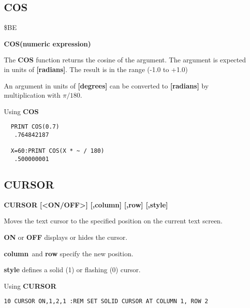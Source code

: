 \subsection{COS}
\begin{description}[leftmargin=2cm,style=nextline]
\item [Token:] \$BE
\item [Format:] {\bf COS(numeric expression)}
\item [Usage:] The {\bf COS} function returns the cosine of the
               argument.
               The argument is expected in units of {\bf [radians]}.
               The result is in the range (-1.0 to +1.0)

\item [Remarks:] An argument in units of {\bf [degrees]}
                 can be converted to {\bf [radians]}
               by multiplication with $\pi/180$.
\item [Example:] Using {\bf COS}
\begin{tcolorbox}[colback=black,coltext=white]
\verbatimfont{\codefont}
\begin{verbatim}
  PRINT COS(0.7)
   .764842187

  X=60:PRINT COS(X * ~ / 180)
   .500000001
\end{verbatim}
\end{tcolorbox}
\end{description}


\newpage
\subsection{CURSOR}
\begin{description}[leftmargin=2cm,style=nextline]
\item [Format:] {\bf CURSOR [<ON/OFF>] [,column] [,row] [,style]}
\item [Usage:] Moves the text cursor to
               the specified position on the current text screen.

               {\bf ON} or {\bf OFF} displays or hides the cursor.

               {\bf column} and {\bf row} specify the new position.

               {\bf style} defines a solid (1) or flashing (0) cursor.

\item [Example:] Using {\bf CURSOR}
\begin{tcolorbox}[colback=black,coltext=white]
\verbatimfont{\codefont}
\begin{verbatim}
10 CURSOR ON,1,2,1 :REM SET SOLID CURSOR AT COLUMN 1, ROW 2
\end{verbatim}
\end{tcolorbox}
\end{description}

